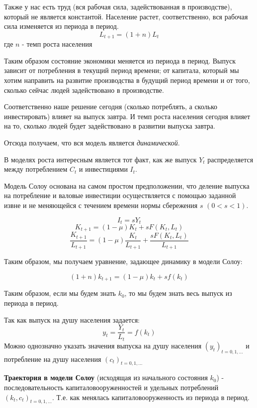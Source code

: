 \documentclass[reqno]{article}
\theoremstyle{definition}
\theoremstyle{definition}
\theoremstyle{definition}
\theoremstyle{definition}
\theoremstyle{definition}
\theoremstyle{definition}
\theoremstyle{definition}
\theoremstyle{definition}
\theoremstyle{definition}
\begin{document}
	Также у нас есть труд (вся рабочая сила, задействованная в производстве), который не является константой. Население растет, соответственно, вся рабочая сила изменяется из периода в период. 
	\begin{equation}\label{eq:1.3.3}
		L_{t+1} = (1 + n) L_t
	\end{equation}
	где $n$ - темп роста населения
	
	Таким образом состояние экономики меняется из периода в период. Выпуск зависит от потребления в текущий период времени; от капитала, который мы хотим направить на развитие производства в будущий период времени и от того, сколько сейчас людей задействовано в производстве. 
	
	Соответственно наше решение сегодня (сколько потреблять, а сколько инвестировать) влияет на выпуск завтра. И темп роста населения сегодня влияет на то, сколько людей будет задействовано в развитии выпуска завтра. 
	
	Отсюда получаем, что вся модель является \emph{динамической}.\bigskip
	
	В моделях роста интересным является тот факт, как же выпуск $Y_t$ распределяется между потреблением $C_t$ и инвестициями $I_t$.
	
	Модель Солоу основана на самом простом предположении, что деление выпуска на потребление и валовые инвестиции осуществляется с помощью заданной извне и не меняющейся с течением времени нормы сбережения $s$ $(0 < s < 1)$. 
	
	$$I_t = s Y_t$$
	$$K_{t+1} = (1 - \mu) K_t + s F(K_t, L_t)$$
	$$\frac{K_{t+1}}{L_{t+1}} = (1 - \mu) \frac{K_t}{L_{t+1}} + \frac{s F(K_t, L_t)}{L_{t+1}}$$
	
	Таким образом, мы получаем уравнение, задающее динамику в модели Солоу:
	
	\begin{equation}\label{eq:1.3.4}
		(1 + n) k_{t + 1} = (1 - \mu) k_t + s f(k_t)
	\end{equation}
	
	Таким образом, если мы будем знать $k_0$, то мы будем знать весь выпуск из периода в период.
	
	Так как выпуск на душу населения задается:
	$$y_t = \frac{Y_t}{L_t} = f(k_t)$$
	Можно однозначно указать значения выпуска на душу населения $(y_t)_{t=0,1,\dots }$ и потребление на душу населения $(c_t)_{t=0,1,\dots}$ \bigskip
	
	\textbf{Траектория в модели Солоу} (исходящая из начального состояния $k_0$) - последовательность капиталовооруженностей и удельных потреблений $(k_t, c_t)_{t=0,1,\dots}$. Т.е. как менялась капиталовооруженность из периода в период.
	
\end{document}
